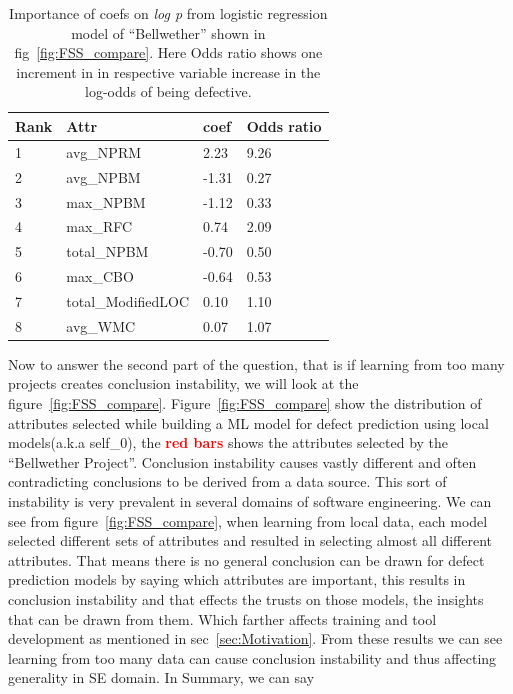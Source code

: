 \documentclass[10pt,journal,compsoc]{IEEEtran}
\begin{document}
\begin{table}[!t]
\centering
\caption{Importance of coefs on \textit{log p} from logistic regression model of ``Bellwether'' shown in fig~\ref{fig:FSS_compare}. Here Odds ratio shows one increment in in respective variable increase in the log-odds of being defective.}
\begin{tabular}{|l|l|l|l|} \hline
Rank & Attr               & coef  & Odds ratio \\ \hline
1    & avg\_NPRM          & 2.23  & 9.26      \\ \hline
2    & avg\_NPBM          & -1.31 & 0.27      \\ \hline
3    & max\_NPBM          & -1.12 & 0.33      \\ \hline
4    & max\_RFC           & 0.74  & 2.09      \\ \hline 
5    & total\_NPBM        & -0.70 & 0.50      \\ \hline
6    & max\_CBO           & -0.64 & 0.53      \\ \hline
7    & total\_ModifiedLOC & 0.10  & 1.10      \\ \hline
8    & avg\_WMC           & 0.07  & 1.07     \\ \hline
\end{tabular}
\label{tbl:coefs}
\end{table}

Now to answer the second part of the question, that is if learning from too many projects creates conclusion instability, we will look at the figure~\ref{fig:FSS_compare}. Figure~\ref{fig:FSS_compare} show the distribution of attributes selected while building a ML model for defect prediction using local models(a.k.a self\_0), the \textcolor{red}{{\bf red bars}} shows the attributes selected by the ``Bellwether Project''. Conclusion instability causes vastly different and often contradicting conclusions to be derived from a data source. This sort of instability is very prevalent in several domains of software engineering. We can see from figure~\ref{fig:FSS_compare}, when learning from local data, each model selected different sets of attributes and resulted in selecting almost all different attributes. That means there is no general conclusion can be drawn for defect prediction models by saying which attributes are important, this results in conclusion instability and that effects the trusts on those models, the insights that can be drawn from them. Which farther affects training and tool development as mentioned in sec~\ref{sec:Motivation}. From these results we can see learning from too many data can cause conclusion instability and thus affecting generality in SE domain. In Summary, we can say 
\end{document}
